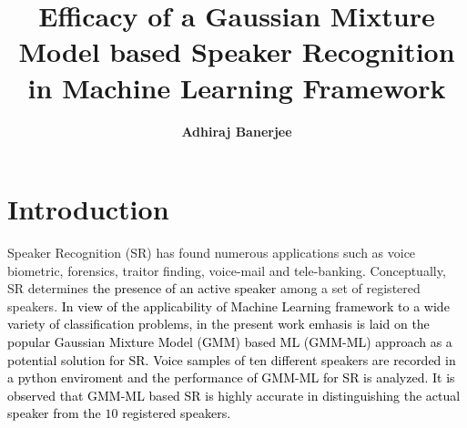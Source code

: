 \documentclass{article}
\title{\textbf{Efficacy of a Gaussian Mixture Model based Speaker Recognition in Machine Learning Framework}}
\author{\textbf{Adhiraj Banerjee}}
\begin{document}
\maketitle
\section{\textbf{{Introduction}}}
Speaker Recognition (SR) has found numerous applications such as voice biometric, forensics, traitor finding, voice-mail and  tele-banking. Conceptually, SR determines \textcolor{black}{the presence of an active speaker} among a set of registered speakers. %
 \textcolor{black}{In view of the applicability of {Machine Learning} framework to a wide variety of classification problems, in the present work emhasis is laid on the popular Gaussian Mixture Model (GMM) based ML (GMM-ML) approach as a potential solution for SR. Voice samples of ten different speakers are recorded in a python enviroment and the performance of GMM-ML for SR is analyzed. It is observed that GMM-ML based SR is highly accurate in distinguishing the actual speaker from the $10$ registered speakers.}
\end{document}
